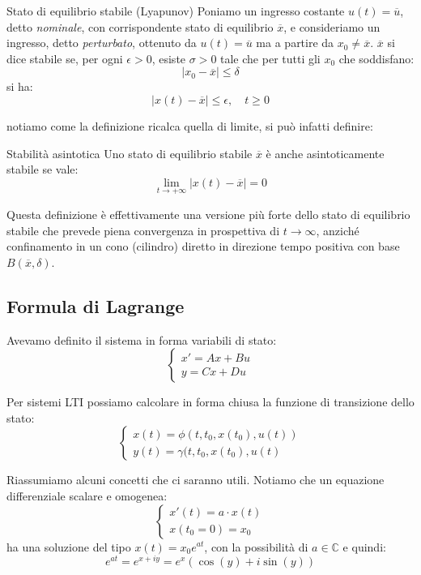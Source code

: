 \documentclass[a4paper,11pt]{article}
\begin{document}
\begin{definition}{Stato di equilibrio stabile (Lyapunov)}
	Poniamo un ingresso costante $u(t) = \overline{u}$, detto \textit{nominale}, con corrispondente stato di equilibrio $\overline{x}$, e consideriamo un ingresso, detto \textit{perturbato}, ottenuto da $u(t) = \overline{u}$ ma a partire da $x_0 \neq \overline{x}$.
	$\overline{x}$ si dice stabile se, per ogni $\epsilon > 0$, esiste $\sigma > 0$ tale che per tutti gli $x_0$ che soddisfano:
	$$
		|x_0 - \overline{x}| \leq \delta 
	$$
	si ha:
	$$
		|x(t) - \overline{x} | \leq \epsilon, \quad t \geq 0 
	$$
\end{definition}
notiamo come la definizione ricalca quella di limite, si può infatti definire:
\begin{definition}{Stabilità asintotica}
	Uno stato di equilibrio stabile $\overline{x}$ è anche asintoticamente stabile se vale:
	$$
		\lim_{t\rightarrow+\infty} |x(t) - \overline{x}| = 0 
	$$
\end{definition}

Questa definizione è effettivamente una versione più forte dello stato di equilibrio stabile che prevede piena convergenza in prospettiva di $t \rightarrow \infty$, anziché confinamento in un cono (cilindro) diretto in direzione tempo positiva con base $B(\overline{x}, \delta)$.

\subsection{Formula di Lagrange}
Avevamo definito il sistema in forma variabili di stato:
\[
	\begin{cases}
		x' = Ax + Bu \\ 
		y = Cx + Du
	\end{cases}
\]

Per sistemi LTI possiamo calcolare in forma chiusa la funzione di transizione dello stato:
\[
	\begin{cases}			
		x(t) = \phi(t, t_0, x(t_0), u(t)) \\ 
		y(t) = \gamma(t, t_0, x(t_0), u(t)  
	\end{cases}
\]

Riassumiamo alcuni concetti che ci saranno utili.
Notiamo che un equazione differenziale scalare e omogenea:
\[
	\begin{cases}
		x'(t) = a \cdot x(t) \\ 
		x(t_0 = 0) = x_0
	\end{cases}
\]
ha una soluzione del tipo $x(t) = x_0 e^{at}$, con la possibilità di $a \in \mathbb{C}$ e quindi:
$$
e^{at} = e^{x + iy} = e^x \left( \cos(y) + i \sin(y) \right)
$$
\end{document}
